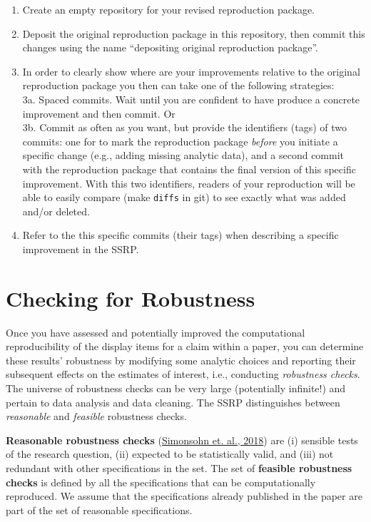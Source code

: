 \documentclass[
  openany]{book}
\providecommand{\tightlist}{%
  \setlength{\itemsep}{0pt}\setlength{\parskip}{0pt}}
\begin{document}
\begin{enumerate}
\def\labelenumi{\arabic{enumi}.}
\tightlist
\item
  Create an empty repository for your revised reproduction package.
\item
  Deposit the original reproduction package in this repository, then commit this changes using the name ``depositing original reproduction package''.\\
\item
  In order to clearly show where are your improvements relative to the original reproduction package you then can take one of the following strategies:\\
  3a. Spaced commits. Wait until you are confident to have produce a concrete improvement and then commit. Or\\
  3b. Commit as often as you want, but provide the identifiers (tags) of two commits: one for to mark the reproduction package \emph{before} you initiate a specific change (e.g., adding missing analytic data), and a second commit with the reproduction package that contains the final version of this specific improvement. With this two identifiers, readers of your reproduction will be able to easily compare (make \texttt{diffs} in git) to see exactly what was added and/or deleted.\\
\item
  Refer to the this specific commits (their tags) when describing a specific improvement in the SSRP.
\end{enumerate}

\hypertarget{robust}{%
\chapter{Checking for Robustness}\label{robust}}

Once you have assessed and potentially improved the computational reproducibility of the display items for a claim within a paper, you can determine these results' robustness by modifying some analytic choices and reporting their subsequent effects on the estimates of interest, i.e., conducting \emph{robustness checks}. The universe of robustness checks can be very large (potentially infinite!) and pertain to data analysis and data cleaning. The SSRP distinguishes between \emph{reasonable} and \emph{feasible} robustness checks.

\textbf{Reasonable robustness checks} (\href{https://urisohn.com/sohn_files/wp/wordpress/wp-content/uploads/Paper-Specification-curve-2018-11-02.pdf}{Simonsohn et. al., 2018}) are (i) sensible tests of the research question, (ii) expected to be statistically valid, and (iii) not redundant with other specifications in the set. The set of \textbf{feasible robustness checks} is defined by all the specifications that can be computationally reproduced. We assume that the specifications already published in the paper are part of the set of reasonable specifications.
\end{document}

